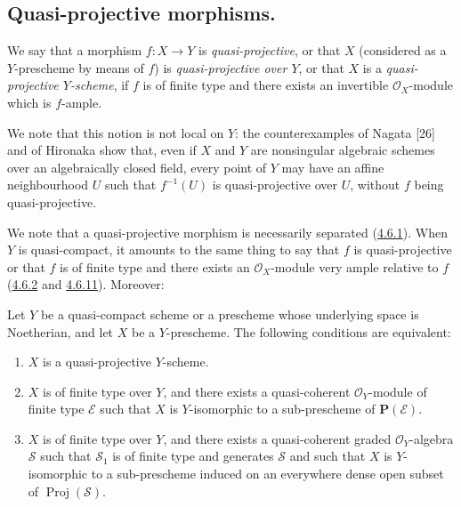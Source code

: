 \subsection{Quasi-projective morphisms.}
\label{subsection:II.5.3}

\begin{definition}[5.3.1]
\label{II.5.3.1}
We say that a morphism $f:X\to Y$ is \emph{quasi-projective}, or that $X$
(considered as a $Y$-prescheme by means of $f$) is \emph{quasi-projective
over $Y$}, or that $X$ is a \emph{quasi-projective $Y$-scheme}, if $f$ is of
finite type and there exists an invertible $\mathcal{O}_X$-module which is
$f$-ample.
\end{definition}

We note that this notion is not local on $Y$: the counterexamples of
Nagata [26] and of Hironaka show that, even if $X$ and $Y$ are nonsingular
algebraic schemes over an algebraically closed field, every point of
$Y$ may have an affine neighbourhood $U$ such that $f^{-1}(U)$ is
quasi-projective over $U$, without $f$ being quasi-projective.

We note that a quasi-projective morphism is necessarily separated
(\hyperref[II.4.6.1]{4.6.1}). When $Y$ is quasi-compact, it amounts to
the same thing to say that $f$ is quasi-projective or that $f$ is of finite
type and there exists an $\mathcal{O}_X$-module very ample relative to $f$
(\hyperref[II.4.6.2]{4.6.2} and \hyperref[II.4.6.11]{4.6.11}). Moreover:

\begin{proposition}[5.3.2]
\label{II.5.3.2}
Let $Y$ be a quasi-compact scheme or a prescheme whose underlying space
is Noetherian, and let $X$ be a $Y$-prescheme. The following conditions are
equivalent:
\begin{enumerate}
  \item[\rm{a)}] $X$ is a quasi-projective $Y$-scheme.
  \item[\rm{b)}] $X$ is of finite type over $Y$, and there exists a
  quasi-coherent $\mathcal{O}_Y$-module of finite type $\mathcal{E}$ such that
  $X$ is $Y$-isomorphic to a sub-prescheme of $\mathbf{P}(\mathcal{E})$.
  \item[\rm{c)}] $X$ is of finite type over $Y$, and there exists a
  quasi-coherent graded $\mathcal{O}_Y$-algebra $\mathcal{S}$ such that
  $\mathcal{S}_1$ is of finite type and generates $\mathcal{S}$ and such that
  $X$ is $Y$-isomorphic to a sub-prescheme induced on an everywhere dense
  open subset of $\operatorname{Proj}(\mathcal{S})$.
\end{enumerate}
\end{proposition}


